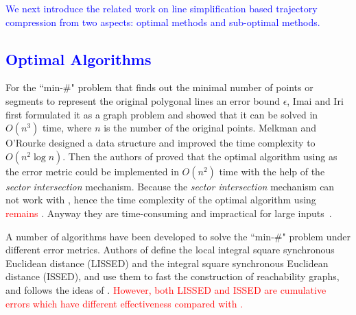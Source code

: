 \textcolor{blue}{We next introduce the related work on line simplification based trajectory compression from two aspects: optimal methods and sub-optimal methods.}

\vspace{-1ex}
\subsection{\textcolor{blue}{Optimal Algorithms}}
For the ``min-\#" problem that finds out the minimal number of points or segments to represent the original polygonal lines \wrt an error bound $\epsilon$, Imai and Iri \cite{Imai:Optimal} first formulated it as a graph problem and showed that it can be solved in  $O(n^3)$ time, where $n$ is the number of the original points.
Melkman and O'Rourke \cite{Melkman:Optimal} designed a data structure and improved the time complexity to $O(n^2 \log n)$.
Then the authors of \cite{Chan:Optimal} proved that the optimal algorithm using \ped as the error metric could be implemented in $O(n^2)$ time with the help of the \textit{sector intersection} mechanism. 
Because the \textit{sector intersection} mechanism can not work with \sed, hence 
the time complexity of the optimal algorithm using \sed \textcolor{red}{remains} . 
Anyway they are time-consuming and impractical for large inputs~\cite{Heckbert:Survey}. 


A number of algorithms \cite{Chen:Fast,Wu:Graph} have been developed to solve the ``min-\#" problem under different error metrics.
Authors of \cite{Chen:Fast} define the local integral square synchronous Euclidean distance (LISSED) and the integral square synchronous Euclidean distance (ISSED), and use them to fast the construction of reachability graphs, and \cite{Wu:Graph} follows the ideas of \cite{Chen:Fast}. 
\textcolor{red}{However, both LISSED and ISSED are cumulative errors which have different effectiveness compared with \sed.} 

%


